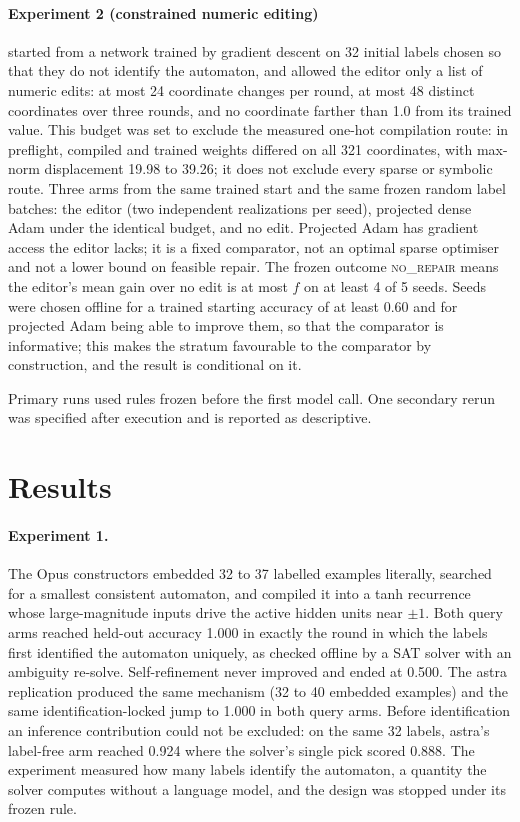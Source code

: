 \documentclass{article}
\begin{document}
\paragraph{Experiment 2 (constrained numeric editing)} started from a network trained by gradient descent on 32 initial labels chosen so that they do not identify the automaton, and allowed the editor only a list of numeric edits: at most 24 coordinate changes per round, at most 48 distinct coordinates over three rounds, and no coordinate farther than 1.0 from its trained value. This budget was set to exclude the measured one-hot compilation route: in preflight, compiled and trained weights differed on all 321 coordinates, with max-norm displacement 19.98 to 39.26; it does not exclude every sparse or symbolic route. Three arms from the same trained start and the same frozen random label batches: the editor (two independent realizations per seed), projected dense Adam under the identical budget, and no edit. Projected Adam has gradient access the editor lacks; it is a fixed comparator, not an optimal sparse optimiser and not a lower bound on feasible repair. The frozen outcome \textsc{no\_repair} means the editor's mean gain over no edit is at most $f$ on at least 4 of 5 seeds. Seeds were chosen offline for a trained starting accuracy of at least 0.60 and for projected Adam being able to improve them, so that the comparator is informative; this makes the stratum favourable to the comparator by construction, and the result is conditional on it.

Primary runs used rules frozen before the first model call. One secondary rerun was specified after execution and is reported as descriptive.

\section{Results}

\paragraph{Experiment 1.} The Opus constructors embedded 32 to 37 labelled examples literally, searched for a smallest consistent automaton, and compiled it into a tanh recurrence whose large-magnitude inputs drive the active hidden units near $\pm 1$. Both query arms reached held-out accuracy 1.000 in exactly the round in which the labels first identified the automaton uniquely, as checked offline by a SAT solver with an ambiguity re-solve. Self-refinement never improved and ended at 0.500. The astra replication produced the same mechanism (32 to 40 embedded examples) and the same identification-locked jump to 1.000 in both query arms. Before identification an inference contribution could not be excluded: on the same 32 labels, astra's label-free arm reached 0.924 where the solver's single pick scored 0.888. The experiment measured how many labels identify the automaton, a quantity the solver computes without a language model, and the design was stopped under its frozen rule.
\end{document}
